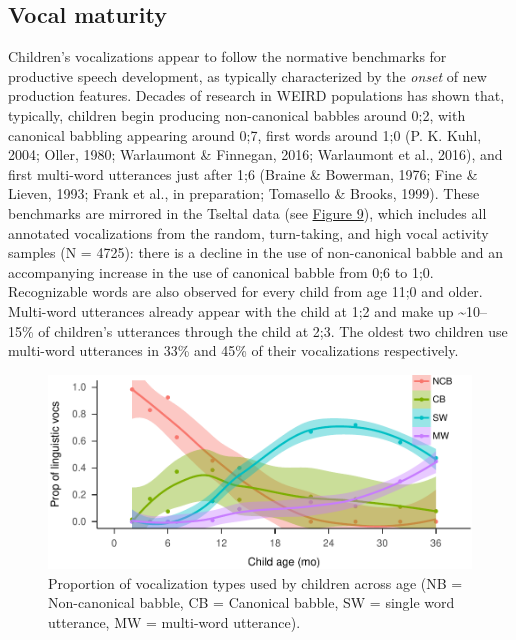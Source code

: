 \documentclass[floatsintext,man]{apa6}
\theoremstyle{definition}
\theoremstyle{definition}
\theoremstyle{definition}
\theoremstyle{remark}
\begin{document}
\subsection{Vocal maturity}\label{vocal-maturity}

Children's vocalizations appear to follow the normative benchmarks for
productive speech development, as typically characterized by the
\emph{onset} of new production features. Decades of research in WEIRD
populations has shown that, typically, children begin producing
non-canonical babbles around 0;2, with canonical babbling appearing
around 0;7, first words around 1;0 (P. K. Kuhl, 2004; Oller, 1980;
Warlaumont \& Finnegan, 2016; Warlaumont et al., 2016), and first
multi-word utterances just after 1;6 (Braine \& Bowerman, 1976; Fine \&
Lieven, 1993; Frank et al., in preparation; Tomasello \& Brooks, 1999).
These benchmarks are mirrored in the Tseltal data (see
\protect\hyperlink{fig9}{Figure 9}), which includes all annotated
vocalizations from the random, turn-taking, and high vocal activity
samples (N = 4725): there is a decline in the use of non-canonical
babble and an accompanying increase in the use of canonical babble from
0;6 to 1;0. Recognizable words are also observed for every child from
age 11;0 and older. Multi-word utterances already appear with the child
at 1;2 and make up \textasciitilde{}10--15\% of children's utterances
through the child at 2;3. The oldest two children use multi-word
utterances in 33\% and 45\% of their vocalizations respectively.

\begin{figure}
\centering
\includegraphics{Tseltal-CLE_files/figure-latex/fig9-1.pdf}
\caption{\label{fig:fig9}Proportion of vocalization types used by children
across age (NB = Non-canonical babble, CB = Canonical babble, SW =
single word utterance, MW = multi-word utterance).}
\end{figure}
\end{document}
